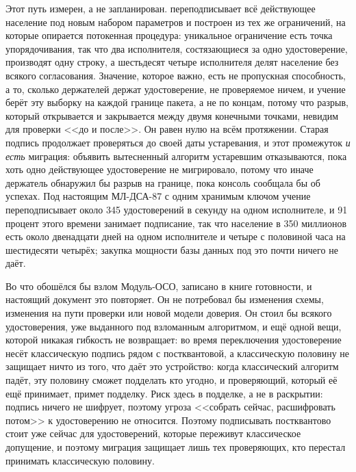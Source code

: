 Этот путь измерен, а не запланирован.  переподписывает всё
действующее население под новым набором параметров и построен из тех же ограничений, на которые
опирается потокенная процедура: уникальное ограничение есть точка упорядочивания, так что два
исполнителя, состязающиеся за одно удостоверение, производят одну строку, а шестьдесят четыре
исполнителя делят население без всякого согласования. Значение, которое важно, есть не
пропускная способность, а то, сколько держателей держат удостоверение, не проверяемое ничем, и
учение берёт эту выборку на каждой границе пакета, а не по концам, потому что разрыв, который
открывается и закрывается между двумя конечными точками, невидим для проверки <<до и после>>. Он
равен нулю на всём протяжении. Старая подпись продолжает проверяться до своей даты устаревания, и
этот промежуток \emph{и есть} миграция: объявить вытесненный алгоритм устаревшим отказываются,
пока хоть одно действующее удостоверение не мигрировало, потому что иначе держатель обнаружил бы
разрыв на границе, пока консоль сообщала бы об успехах. Под настоящим МЛ-ДСА-87 с одним хранимым
ключом учение переподписывает около 345 удостоверений в секунду на одном исполнителе, и 91 процент
этого времени занимает подписание, так что население в 350 миллионов есть около двенадцати дней на
одном исполнителе и четыре с половиной часа на шестидесяти четырёх; закупка мощности базы данных
под это почти ничего не даёт. \sImpl

Во что обошёлся бы взлом Модуль-ОСО, записано в книге готовности, и настоящий документ это
повторяет. Он не потребовал бы изменения схемы, изменения на пути проверки или новой модели
доверия. Он стоил бы всякого удостоверения, уже выданного под взломанным алгоритмом, и ещё одной
вещи, которой никакая гибкость не возвращает: во время переключения удостоверение несёт
классическую подпись рядом с постквантовой, а классическую половину не защищает ничто из того, что
даёт это устройство: когда классический алгоритм падёт, эту половину сможет подделать кто угодно, и
проверяющий, который её ещё принимает, примет подделку. Риск здесь в подделке, а не в раскрытии:
подпись ничего не шифрует, поэтому угроза <<собрать сейчас, расшифровать потом>> к удостоверению не
относится. Поэтому подписывать постквантово стоит уже сейчас для удостоверений, которые переживут
классическое допущение, и поэтому миграция защищает лишь тех проверяющих, кто перестал принимать
классическую половину.

